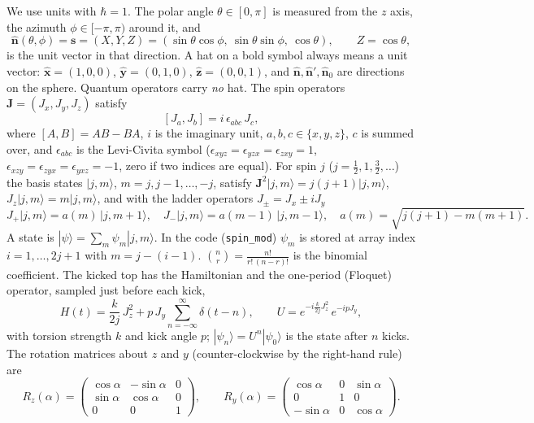 \documentclass[11pt,a4paper]{article}
\newcommand{\vs}{\bm{s}}
\newcommand{\vJ}{\bm{J}}
\newcommand{\vn}{\hat{\bm n}}
\begin{document}
We use units with $\hbar = 1$. The polar angle $\theta\in[0,\pi]$ is measured from the $z$ axis, the azimuth
$\phi\in[-\pi,\pi)$ around it, and
\begin{equation}\label{eq:unit}
  \vn(\theta,\phi) = \vs = (X, Y, Z) = (\sin\theta\cos\phi,\ \sin\theta\sin\phi,\ \cos\theta), \qquad Z = \cos\theta,
\end{equation}
is the unit vector in that direction. A hat on a bold symbol always means a unit vector: $\hat{\bm x}=(1,0,0)$,
$\hat{\bm y}=(0,1,0)$, $\hat{\bm z}=(0,0,1)$, and $\vn,\vn',\vn_0$ are directions on the sphere. Quantum operators carry
\emph{no} hat. The spin operators $\vJ = (J_x,J_y,J_z)$ satisfy
\begin{equation}\label{eq:comm}
  [J_a, J_b] = i\,\epsilon_{abc}\,J_c ,
\end{equation}
where $[A,B] = AB-BA$, $i$ is the imaginary unit, $a,b,c\in\{x,y,z\}$, $c$ is summed over, and $\epsilon_{abc}$ is the
Levi-Civita symbol ($\epsilon_{xyz}=\epsilon_{yzx}=\epsilon_{zxy}=1$, $\epsilon_{xzy}=\epsilon_{zyx}=\epsilon_{yxz}=-1$,
zero if two indices are equal). For spin $j$ ($j = \frac12, 1, \frac32,\dots$) the basis states $|j,m\rangle$,
$m = j, j-1,\dots,-j$, satisfy $\vJ^2|j,m\rangle = j(j+1)|j,m\rangle$, $J_z|j,m\rangle = m|j,m\rangle$, and with
the ladder operators $J_\pm = J_x \pm iJ_y$
\begin{equation}\label{eq:ladder}
  J_+|j,m\rangle = a(m)\,|j,m+1\rangle,\quad J_-|j,m\rangle = a(m-1)\,|j,m-1\rangle,\quad a(m) = \sqrt{j(j+1)-m(m+1)} .
\end{equation}
A state is $|\psi\rangle = \sum_m \psi_m|j,m\rangle$. In the code (\texttt{spin\_mod}) $\psi_m$ is stored at array
index $i = 1,\dots,2j+1$ with $m = j-(i-1)$. $\binom{n}{r} = \frac{n!}{r!\,(n-r)!}$ is the binomial coefficient.
The kicked top has the Hamiltonian and the one-period (Floquet) operator, sampled just before each kick,
\begin{equation}\label{eq:H}
  H(t) = \frac{k}{2j}\,J_z^2 + p\,J_y\sum_{n=-\infty}^{\infty}\delta(t-n),\qquad
  U = e^{-i\frac{k}{2j}J_z^2}\,e^{-ipJ_y},
\end{equation}
with torsion strength $k$ and kick angle $p$; $|\psi_n\rangle = U^n|\psi_0\rangle$ is the state after $n$ kicks.
The rotation matrices about $z$ and $y$ (counter-clockwise by the right-hand rule) are
\begin{equation}\label{eq:rot}
  R_z(\alpha) = \begin{pmatrix} \cos\alpha & -\sin\alpha & 0\\ \sin\alpha & \cos\alpha & 0 \\ 0 & 0 & 1 \end{pmatrix},
  \qquad
  R_y(\alpha) = \begin{pmatrix} \cos\alpha & 0 & \sin\alpha\\ 0 & 1 & 0 \\ -\sin\alpha & 0 & \cos\alpha \end{pmatrix}.
\end{equation}
\end{document}
